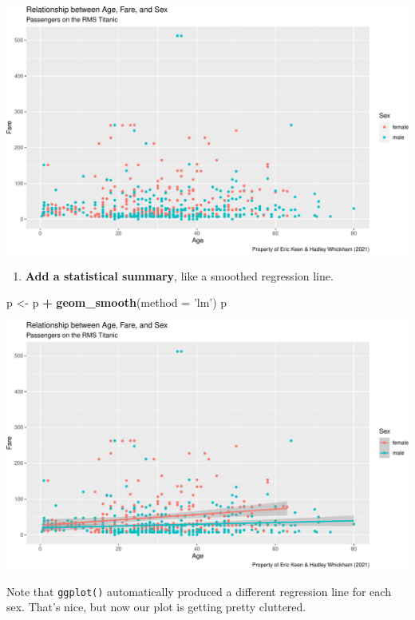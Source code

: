 \documentclass[
]{book}
\newenvironment{Shaded}{\begin{snugshade}}{\end{snugshade}}
\newcommand{\DataTypeTok}[1]{\textcolor[rgb]{0.13,0.29,0.53}{#1}}
\newcommand{\KeywordTok}[1]{\textcolor[rgb]{0.13,0.29,0.53}{\textbf{#1}}}
\newcommand{\NormalTok}[1]{#1}
\newcommand{\OperatorTok}[1]{\textcolor[rgb]{0.81,0.36,0.00}{\textbf{#1}}}
\newcommand{\StringTok}[1]{\textcolor[rgb]{0.31,0.60,0.02}{#1}}
\providecommand{\tightlist}{%
  \setlength{\itemsep}{0pt}\setlength{\parskip}{0pt}}
\begin{document}
\includegraphics{figures/unnamed-chunk-251-1.pdf}

\begin{enumerate}
\def\labelenumi{(\arabic{enumi})}
\setcounter{enumi}{5}
\tightlist
\item
  \textbf{Add a statistical summary}, like a smoothed regression line.
\end{enumerate}

\begin{Shaded}
\begin{Highlighting}[]
\NormalTok{p <-}\StringTok{ }\NormalTok{p }\OperatorTok{+}\StringTok{ }\KeywordTok{geom_smooth}\NormalTok{(}\DataTypeTok{method =} \StringTok{'lm'}\NormalTok{)}
\NormalTok{p}
\end{Highlighting}
\end{Shaded}

\includegraphics{figures/unnamed-chunk-252-1.pdf}

Note that \texttt{ggplot()} automatically produced a different regression line for each sex. That's nice, but now our plot is getting pretty cluttered.
\end{document}

